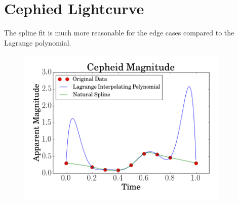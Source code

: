 \documentclass[12pt]{article}
\begin{document}
  \section{Cephied Lightcurve}

  The spline fit is much more reasonable for the edge cases compared to the Lagrange
  polynomial.

  \begin{figure}[h!]
    \centering
    \includegraphics[width=0.9\textwidth]{Problem8.png}
  \end{figure}

  
    
  
\end{document}
